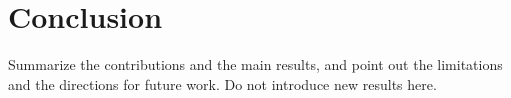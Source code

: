 \section{Conclusion}
\label{sec:conclusion}

Summarize the contributions and the main results, and point out the limitations and the directions for future work. Do not introduce new results here.
